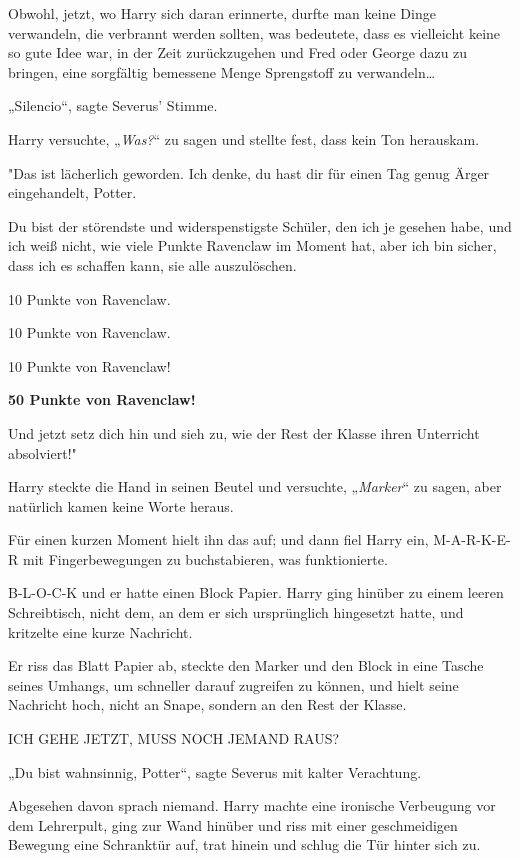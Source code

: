 {Obwohl, jetzt, wo Harry sich daran erinnerte, durfte man keine Dinge verwandeln, die verbrannt werden sollten, was bedeutete, dass es vielleicht keine so gute Idee war, in der Zeit zurückzugehen und Fred oder George dazu zu bringen, eine sorgfältig bemessene Menge Sprengstoff zu verwandeln…

„Silencio“, sagte Severus' Stimme.

Harry versuchte, „\emph{Was?}“ zu sagen und stellte fest, dass kein Ton herauskam.

"Das ist lächerlich geworden. Ich denke, du hast dir für einen Tag genug Ärger eingehandelt, Potter.

Du bist der störendste und widerspenstigste Schüler, den ich je gesehen habe, und ich weiß nicht, wie viele Punkte Ravenclaw im Moment hat, aber ich bin sicher, dass ich es schaffen kann, sie alle auszulöschen.

10 Punkte von Ravenclaw.

10 Punkte von Ravenclaw.

10 Punkte von Ravenclaw!

\textbf{50 Punkte von Ravenclaw!}

Und jetzt setz dich hin und sieh zu, wie der Rest der Klasse ihren Unterricht absolviert!"

Harry steckte die Hand in seinen Beutel und versuchte, „\emph{Marker}“ zu sagen, aber natürlich kamen keine Worte heraus.

Für einen kurzen Moment hielt ihn das auf; und dann fiel Harry ein, M-A-R-K-E-R mit Fingerbewegungen zu buchstabieren, was funktionierte.

B-L-O-C-K und er hatte einen Block Papier. Harry ging hinüber zu einem leeren Schreibtisch, nicht dem, an dem er sich ursprünglich hingesetzt hatte, und kritzelte eine kurze Nachricht.

Er riss das Blatt Papier ab, steckte den Marker und den Block in eine Tasche seines Umhangs, um schneller darauf zugreifen zu können, und hielt seine Nachricht hoch, nicht an Snape, sondern an den Rest der Klasse.

ICH GEHE JETZT, MUSS NOCH JEMAND RAUS?

„Du bist wahnsinnig, Potter“, sagte Severus mit kalter Verachtung.

Abgesehen davon sprach niemand. Harry machte eine ironische Verbeugung vor dem Lehrerpult, ging zur Wand hinüber und riss mit einer geschmeidigen Bewegung eine Schranktür auf, trat hinein und schlug die Tür hinter sich zu.

}
